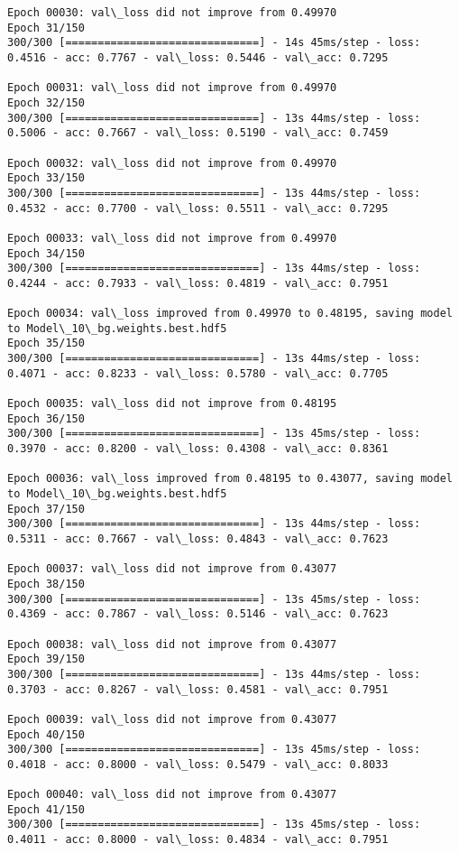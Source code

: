 \documentclass[11pt]{article}
\begin{document}
\begin{Verbatim}[commandchars=\\\{\}]
Epoch 00030: val\_loss did not improve from 0.49970
Epoch 31/150
300/300 [==============================] - 14s 45ms/step - loss: 0.4516 - acc: 0.7767 - val\_loss: 0.5446 - val\_acc: 0.7295

Epoch 00031: val\_loss did not improve from 0.49970
Epoch 32/150
300/300 [==============================] - 13s 44ms/step - loss: 0.5006 - acc: 0.7667 - val\_loss: 0.5190 - val\_acc: 0.7459

Epoch 00032: val\_loss did not improve from 0.49970
Epoch 33/150
300/300 [==============================] - 13s 44ms/step - loss: 0.4532 - acc: 0.7700 - val\_loss: 0.5511 - val\_acc: 0.7295

Epoch 00033: val\_loss did not improve from 0.49970
Epoch 34/150
300/300 [==============================] - 13s 44ms/step - loss: 0.4244 - acc: 0.7933 - val\_loss: 0.4819 - val\_acc: 0.7951

Epoch 00034: val\_loss improved from 0.49970 to 0.48195, saving model to Model\_10\_bg.weights.best.hdf5
Epoch 35/150
300/300 [==============================] - 13s 44ms/step - loss: 0.4071 - acc: 0.8233 - val\_loss: 0.5780 - val\_acc: 0.7705

Epoch 00035: val\_loss did not improve from 0.48195
Epoch 36/150
300/300 [==============================] - 13s 45ms/step - loss: 0.3970 - acc: 0.8200 - val\_loss: 0.4308 - val\_acc: 0.8361

Epoch 00036: val\_loss improved from 0.48195 to 0.43077, saving model to Model\_10\_bg.weights.best.hdf5
Epoch 37/150
300/300 [==============================] - 13s 44ms/step - loss: 0.5311 - acc: 0.7667 - val\_loss: 0.4843 - val\_acc: 0.7623

Epoch 00037: val\_loss did not improve from 0.43077
Epoch 38/150
300/300 [==============================] - 13s 45ms/step - loss: 0.4369 - acc: 0.7867 - val\_loss: 0.5146 - val\_acc: 0.7623

Epoch 00038: val\_loss did not improve from 0.43077
Epoch 39/150
300/300 [==============================] - 13s 44ms/step - loss: 0.3703 - acc: 0.8267 - val\_loss: 0.4581 - val\_acc: 0.7951

Epoch 00039: val\_loss did not improve from 0.43077
Epoch 40/150
300/300 [==============================] - 13s 45ms/step - loss: 0.4018 - acc: 0.8000 - val\_loss: 0.5479 - val\_acc: 0.8033

Epoch 00040: val\_loss did not improve from 0.43077
Epoch 41/150
300/300 [==============================] - 13s 45ms/step - loss: 0.4011 - acc: 0.8000 - val\_loss: 0.4834 - val\_acc: 0.7951


\end{Verbatim}
\end{document}
